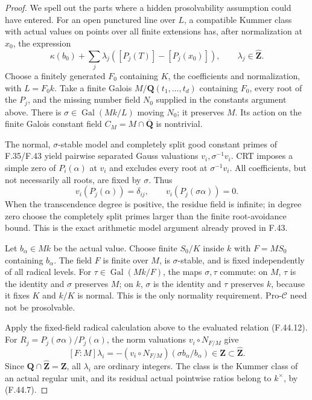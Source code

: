 \begin{proof}

We spell out the parts where a hidden prosolvability assumption could have entered. For an open punctured line over \(L\), a compatible Kummer class with actual values on points over all finite extensions has, after normalization at \(x_0\), the expression
\[
 \kappa(b_0)+\sum_j\lambda_j([P_j(T)]-[P_j(x_0)]),
 \qquad \lambda_j\in\widehat{\mathbf Z}.
 \tag{F.44.12}
\]
Choose a finitely generated \(F_0\) containing \(K\), the coefficients and normalization, with \(L=F_0k\). Take a finite Galois \(M/\mathbf Q(t_1,\ldots,t_d)\) containing \(F_0\), every root of the \(P_j\), and the missing number field \(N_0\) supplied in the constants argument above. There is \(\sigma\in\operatorname{Gal}(Mk/L)\) moving \(N_0\); it preserves \(M\). Its action on the finite Galois constant field \(C_M=M\cap\overline{\mathbf Q}\) is nontrivial.

The normal, \(\sigma\)-stable model and completely split good constant primes of F.35/F.43 yield pairwise separated Gauss valuations \(v_i,\sigma^{-1}v_i\). CRT imposes a simple zero of \(P_i(\alpha)\) at \(v_i\) and excludes every root at \(\sigma^{-1}v_i\). All coefficients, but not necessarily all roots, are fixed by \(\sigma\). Thus
\[
 v_i(P_j(\alpha))=\delta_{ij},\qquad
 v_i(P_j(\sigma\alpha))=0.
 \tag{F.44.13}
\]
When the transcendence degree is positive, the residue field is infinite; in degree zero choose the completely split primes larger than the finite root-avoidance bound. This is the exact arithmetic model argument already proved in F.43.

Let \(b_\alpha\in Mk\) be the actual value. Choose finite \(S_0/K\) inside \(k\) with \(F=MS_0\) containing \(b_\alpha\). The field \(F\) is finite over \(M\), is \(\sigma\)-stable, and is fixed independently of all radical levels. For \(\tau\in\operatorname{Gal}(Mk/F)\), the maps \(\sigma,\tau\) commute: on \(M\), \(\tau\) is the identity and \(\sigma\) preserves \(M\); on \(k\), \(\sigma\) is the identity and \(\tau\) preserves \(k\), because it fixes \(K\) and \(k/K\) is normal. This is the only normality requirement. Pro-\(\mathcal C\) need not be prosolvable.

Apply the fixed-field radical calculation above to the evaluated relation \textup{(F.44.12)}. For \(R_j=P_j(\sigma\alpha)/P_j(\alpha)\), the norm valuations \(v_i\circ N_{F/M}\) give
\[
 [F:M]\lambda_i
       =-(v_i\circ N_{F/M})(\sigma b_\alpha/b_\alpha)
                         \in\mathbf Z\subset\widehat{\mathbf Z}.
 \tag{F.44.14}
\]
Since \(\mathbf Q\cap\widehat{\mathbf Z}=\mathbf Z\), all \(\lambda_i\) are ordinary integers. The class is the Kummer class of an actual regular unit, and its residual actual pointwise ratios belong to \(k^\times\), by \textup{(F.44.7)}.


\end{proof}
